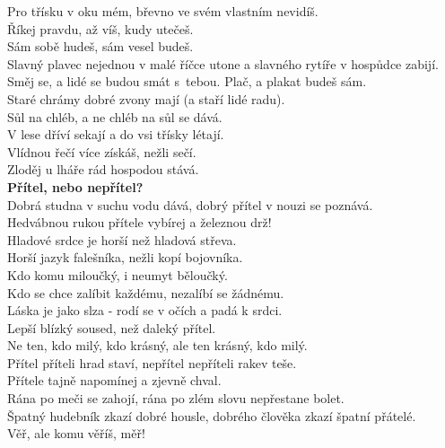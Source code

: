\begin{multicols}{\value{columnsgames}}
Pro třísku v oku mém, břevno ve svém vlastním nevidíš.\\
Říkej pravdu, až víš, kudy utečeš.\\
Sám sobě hudeš, sám vesel budeš.\\
Slavný plavec nejednou v malé říčce utone a slavného rytíře v 
hospůdce zabijí.\\
Směj se, a lidé se budou smát s~tebou. Plač, a plakat 
budeš sám.\\
Staré chrámy dobré zvony mají (a staří lidé radu).\\
Sůl na chléb, a ne chléb na sůl se dává.\\
V lese dříví sekají a do vsi třísky létají.\\
Vlídnou řečí více získáš, nežli sečí.\\
Zloděj u lháře rád hospodou stává.\\

\noindent
{\large\bf Přítel, nebo nepřítel?}\\[1 mm]
Dobrá studna v suchu vodu dává, dobrý přítel v nouzi se poznává.\\
Hedvábnou rukou přítele vybírej a železnou drž!\\
Hladové srdce je horší než hladová střeva.\\
Horší jazyk falešníka, nežli kopí bojovníka.\\
Kdo komu miloučký, i neumyt běloučký.\\
Kdo se chce zalíbit každému, nezalíbí se žádnému.\\
Láska je jako slza - rodí se v očích a padá k srdci.\\
Lepší blízký soused, než daleký přítel.\\
Ne ten, kdo milý, kdo krásný, ale ten krásný, kdo milý.\\
Přítel příteli hrad staví, nepřítel nepříteli rakev teše.\\
Přítele tajně napomínej a zjevně chval.\\
Rána po meči se zahojí, rána po zlém slovu nepřestane bolet.\\
Špatný hudebník zkazí dobré housle, dobrého člověka zkazí špatní 
přátelé.\\
Věř, ale komu věříš, měř!\\


\end{multicols}
